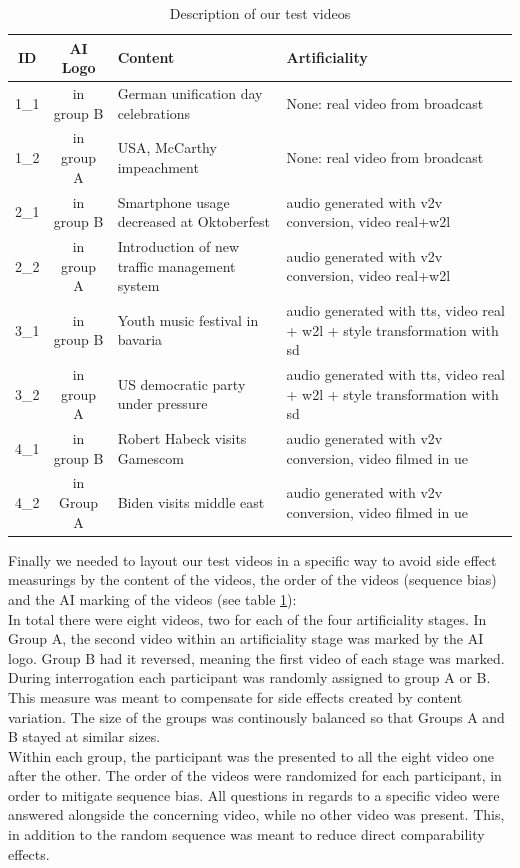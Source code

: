 \documentclass[
  a4paper,  %
  twoside,  %
  bibliography=totoc,
  headsepline,
  cleardoublepage=empty,
  parskip=half,
  draft=false
]{scrbook}
\begin{document}
\begin{table}[h]
  \centering
  \begin{tabularx}{\linewidth}{c|c|X|X}
    \textbf{ID} & \textbf{AI Logo} & \textbf{Content} & \textbf{Artificiality}\\
    \midrule
    1\_1 & in group B & German unification day celebrations  & None: real video from broadcast \\
    \midrule
    1\_2 & in group A & USA, McCarthy impeachment  & None: real video from broadcast \\
    \midrule
    2\_1 & in group B & Smartphone usage decreased at Oktoberfest  & audio generated with \gls{v2v} conversion, video real+\gls{w2l} \\
    \midrule
    2\_2 & in group A & Introduction of new traffic management system  & audio generated with \gls{v2v} conversion, video real+\gls{w2l} \\
    \midrule
    3\_1 & in group B & Youth music festival in bavaria  & audio generated with \gls{tts}, video real + \gls{w2l} + style transformation with \gls{sd} \\
    \midrule
    3\_2 & in group A & US democratic party under pressure  & audio generated with \gls{tts}, video real + \gls{w2l} + style transformation with \gls{sd} \\
    \midrule
    4\_1 & in group B & Robert Habeck visits Gamescom  & audio generated with \gls{v2v} conversion, video filmed in \gls{ue} \\
    \midrule
    4\_2 & in Group A & Biden visits middle east  & audio generated with \gls{v2v} conversion, video filmed in \gls{ue} \\
  \end{tabularx}
  \caption{Description of our test videos}
  \label{tab:video-table}
\end{table}
Finally we needed to layout our test videos in a specific way to avoid side effect measurings by the content of the videos, the order of the videos (sequence bias) and the AI marking of the videos (see table \ref{tab:video-table}): \\
In total there were eight videos, two for each of the four artificiality stages. In Group A, the second video within an artificiality stage was marked by the AI logo. Group B had it reversed, meaning the first video of each stage was marked. \\
During interrogation each participant was randomly assigned to group A or B. This measure was meant to compensate for side effects created by content variation. The size of the groups was continously balanced so that Groups A and B stayed at similar sizes. \\
Within each group, the participant was the presented to all the eight video one after the other. The order of the videos were randomized for each participant, in order to mitigate sequence bias. All questions in regards to a specific video were answered alongside the concerning video, while no other video was present. This, in addition to the random sequence was meant to reduce direct comparability effects.
\end{document}
